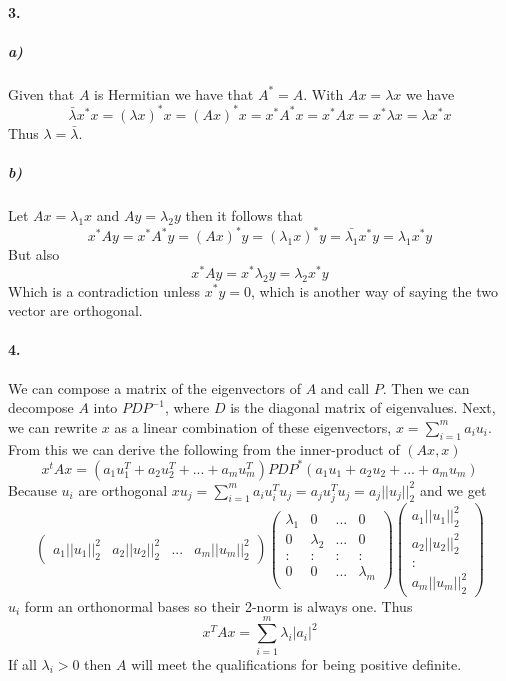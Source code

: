 \documentclass[12pt]{article}
\begin{document}
\paragraph{3.}
	\subparagraph{a)}
		Given that $A$ is Hermitian we have that $A^*=A$. With $Ax = \lambda x$ we have
		\[
		\bar{\lambda}x^*x = (\lambda x)^* x = (Ax)^*x = x^*A^*x = x^*Ax = x^*\lambda x = \lambda x^*x
		\]
		Thus $\lambda = \bar{\lambda}$.

	\subparagraph{b)}
		Let $Ax = \lambda_1 x$ and $Ay = \lambda_2 y$ then it follows that
		\[
		x^*Ay = x^*A^*y = (Ax)^*y = (\lambda_1 x)^*y = \bar{\lambda_1}x^*y = \lambda_1 x^*y
		\]
		But also
		\[
		x^*Ay = x^*\lambda_2 y = \lambda_2 x^*y
		\]
		Which is a contradiction unless $x^*y = 0$, which is another way of saying the two vector are orthogonal. 

\paragraph{4.}
	We can compose a matrix of the eigenvectors of $A$ and call $P$. Then we can decompose $A$ into $PDP^{-1}$, where $D$ is the diagonal matrix of eigenvalues. Next, we can rewrite $x$ as a linear combination of these eigenvectors, $x = \sum_{i=1}^{m} a_iu_i$. From this we can derive the following from the inner-product of $(Ax,x)$
	\[
	x^tAx = (a_1u_1^T + a_2u_2^T + ... + a_mu_m^T)PDP^*(a_1u_1 + a_2u_2 + ... + a_mu_m)
	\]
	Because $u_i$ are orthogonal $xu_j = \sum_{i=1}^{m} a_iu_i^Tu_j = a_ju_j^Tu_j = a_j||u_j||_2^2$ and we get
	\[
	(\begin{matrix}
	a_1||u_1||_2^2 & a_2||u_2||_2^2 & ... & a_m||u_m||_2^2
	\end{matrix})
	\left(\begin{matrix}
	\lambda_1 & 0 & ... & 0 \\
	0 & \lambda_2 & ... & 0 \\
	: & : & : & : \\
	0 & 0 & ... & \lambda_m \\
	\end{matrix}\right)
	\left(\begin{matrix}
	a_1||u_1||_2^2 \\
	a_2||u_2||_2^2 \\ 
	: \\ 
	a_m||u_m||_2^2
	\end{matrix}\right)
	\]
	$u_i$ form an orthonormal bases so their 2-norm is always one. Thus 
	\[
	x^TAx = \sum_{i=1}^{m} \lambda_i|a_i|^2
	\]
	If all $\lambda_i > 0$ then $A$ will meet the qualifications for being positive definite. 
\end{document}
